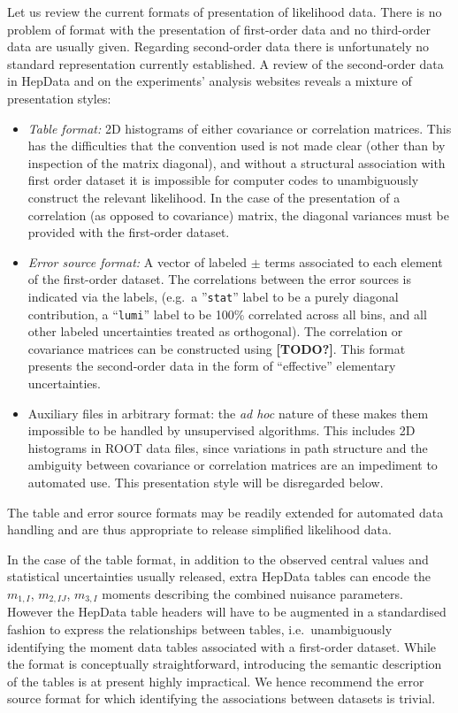 \documentclass[11pt]{article}
\begin{document}
Let us review the current formats of presentation of likelihood data. There is
no problem of format with the presentation of first-order data and no
third-order data are usually given. Regarding second-order data there is
unfortunately no standard representation currently established.  A review of the
second-order data in HepData and on the experiments' analysis websites reveals a
mixture of presentation styles:
%
\begin{itemize}
\item \textit{Table format:} 2D histograms of either covariance or correlation
  matrices. This has the difficulties that the convention used is not made clear
  (other than by inspection of the matrix diagonal), and without a structural
  association with first order dataset it is impossible for computer codes to
  unambiguously construct the relevant likelihood. In the case of the
  presentation of a correlation (as opposed to covariance) matrix, the diagonal
  variances must be provided with the first-order dataset.

\item \textit{Error source format:} A vector of labeled $\pm$ terms associated
  to each element of the first-order dataset. The correlations between the error
  sources is indicated via the labels, (e.g.~a ''\texttt{stat}'' label to be a
  purely diagonal contribution, a ``\texttt{lumi}'' label to be 100\% correlated
  across all bins, and all other labeled uncertainties treated as orthogonal).
  The correlation or covariance matrices can be constructed using \textbf{[TODO?]}.
  This format presents the second-order data in the form of ``effective''
  elementary uncertainties.

\item Auxiliary files in arbitrary format: the \emph{ad hoc} nature of these
  makes them impossible to be handled by unsupervised algorithms. This includes
  2D histograms in ROOT data files, since variations in path structure and the
  ambiguity between covariance or correlation matrices are an impediment to
  automated use. This presentation style will be disregarded below.
\end{itemize}
%
The table and error source formats  may be readily extended for automated data
handling and are thus appropriate to release simplified likelihood data.

In the case of the table format, in addition to the observed central values and
statistical uncertainties usually released, extra HepData tables can encode the
$m_{1,I}$, $m_{2,IJ}$, $m_{3,I}$ moments describing the combined nuisance
parameters.  However the HepData table headers will have to be augmented in a
standardised fashion to express the relationships between tables,
i.e.~unambiguously identifying the moment data tables associated with a
first-order dataset. While the format is conceptually straightforward,
introducing the semantic description of the tables is at present highly
impractical. We hence recommend the error source format for which identifying
the associations between datasets is trivial.
\end{document}
